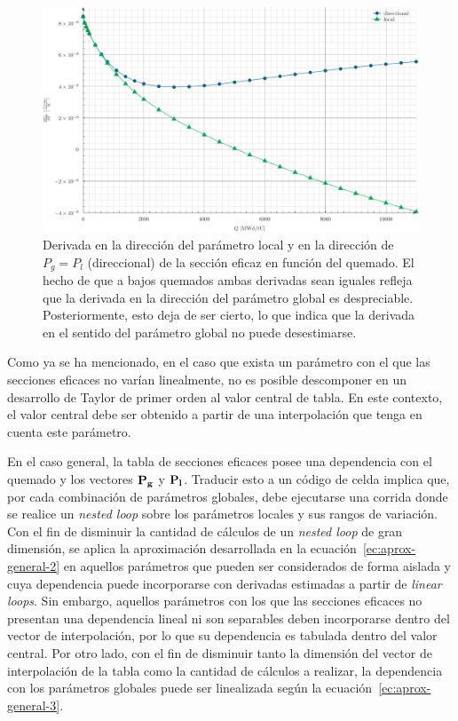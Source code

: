 \documentclass[11pt]{article}
\renewcommand{\vec}[1]{\ensuremath\mathbf{#1}}
\begin{document}
\begin{figure}[!h]
 \begin{center}
  \includegraphics[width=0.9\linewidth]{graficos/dependencias-xs/dxs.pdf}
 \end{center}
\caption{\label{fig:global-local-pth-3} Derivada en la dirección del parámetro local y en la dirección de $P_g = P_l$ (direccional) de la sección eficaz en función del quemado. El hecho de que a bajos quemados ambas derivadas sean iguales refleja que la derivada en la dirección del parámetro global es despreciable. Posteriormente, esto deja de ser cierto, lo que indica que la derivada en el sentido del parámetro global no puede desestimarse.}
\end{figure}

Como ya se ha mencionado, en el caso que exista un parámetro con el que las secciones eficaces no varían linealmente, no es posible descomponer en un desarrollo de Taylor de primer orden al valor central de tabla. En este contexto, el valor central debe ser obtenido a partir de una interpolación que tenga en cuenta este parámetro. 

En el caso general, la tabla de secciones eficaces posee una dependencia con el quemado y los vectores $\vec{P_g}$ y $\vec{P_l}$. Traducir esto a un código de celda implica que, por cada combinación de parámetros globales, debe ejecutarse una corrida donde se realice un \emph{nested loop} sobre los parámetros locales y sus rangos de variación. Con el fin de disminuir la cantidad de cálculos de un \emph{nested loop} de gran dimensión, se aplica la aproximación desarrollada en la ecuación~\ref{ec:aprox-general-2} en aquellos parámetros que pueden ser considerados de forma aislada y cuya dependencia puede incorporarse con derivadas estimadas a partir de \emph{linear loops}. Sin embargo, aquellos parámetros con los que las secciones eficaces no presentan una dependencia lineal ni son separables deben incorporarse dentro del vector de interpolación, por lo que su dependencia es tabulada dentro del valor central. Por otro lado, con el fin de disminuir tanto la dimensión del vector de interpolación de la tabla como la cantidad de cálculos a realizar, la dependencia con los parámetros globales puede ser linealizada según la ecuación~\ref{ec:aprox-general-3}.
\end{document}
